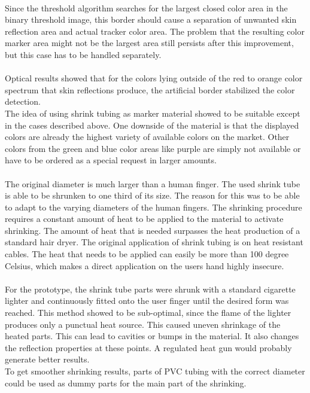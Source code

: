 \\Since the threshold algorithm searches for the largest closed color area in the binary threshold image, this border should cause a separation of unwanted skin reflection area and actual tracker color area. The problem that the resulting color marker area might not be the largest area still persists after this improvement, but this case has to be handled separately.
\\\\Optical results showed that for the colors lying outside of the red to orange color spectrum that skin reflections produce, the artificial border stabilized the color detection.
\\The idea of using shrink tubing as marker material showed to be suitable except in the cases described above. One downside of the material is that the displayed colors are already the highest variety of available colors on the market. Other colors from the green and blue color areas like purple are simply not available or have to be ordered as a special request in larger amounts.
\\\\The original diameter is much larger than a human finger. The used shrink tube is able to be shrunken to one third of its size. The reason for this was to be able to adapt to the varying diameters of the human fingers. The shrinking procedure requires a constant amount of heat to be applied to the material to activate shrinking. The amount of heat that is needed surpasses the heat production of a standard hair dryer. The original application of shrink tubing is on heat resistant cables. The heat that needs to be applied can easily be more than 100 degree Celsius, which makes a direct application on the users hand highly insecure.
\\\\For the prototype, the shrink tube parts were shrunk with a standard cigarette lighter and continuously fitted onto the user finger until the desired form was reached. This method showed to  be sub-optimal, since the flame of the lighter produces only a punctual heat source. This caused uneven shrinkage of the heated parts. This can lead to cavities or bumps in the material. It  also changes the reflection properties at these points. A regulated heat gun would probably generate better results.
\\To get smoother shrinking results, parts of PVC tubing with the correct diameter could be used as dummy parts for the main part of the shrinking.\\
